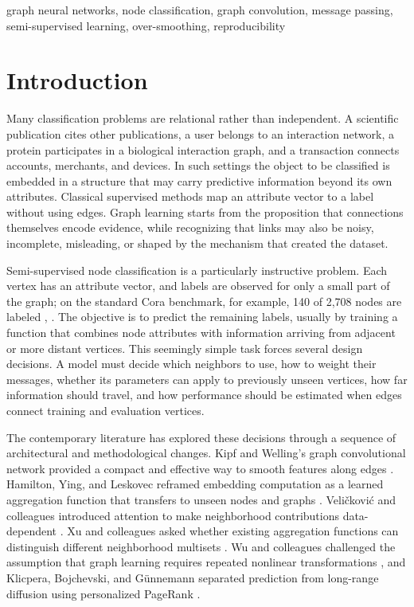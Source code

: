 \documentclass[conference]{IEEEtran}
\begin{document}
\begin{IEEEkeywords}
graph neural networks, node classification, graph convolution, message passing, semi-supervised learning, over-smoothing, reproducibility
\end{IEEEkeywords}

\section{Introduction}

Many classification problems are relational rather than independent. A scientific publication cites other publications, a user belongs to an interaction network, a protein participates in a biological interaction graph, and a transaction connects accounts, merchants, and devices. In such settings the object to be classified is embedded in a structure that may carry predictive information beyond its own attributes. Classical supervised methods map an attribute vector to a label without using edges. Graph learning starts from the proposition that connections themselves encode evidence, while recognizing that links may also be noisy, incomplete, misleading, or shaped by the mechanism that created the dataset.

Semi-supervised node classification is a particularly instructive problem. Each vertex has an attribute vector, and labels are observed for only a small part of the graph; on the standard Cora benchmark, for example, 140 of 2,708 nodes are labeled \cite{b1}, \cite{b12}. The objective is to predict the remaining labels, usually by training a function that combines node attributes with information arriving from adjacent or more distant vertices. This seemingly simple task forces several design decisions. A model must decide which neighbors to use, how to weight their messages, whether its parameters can apply to previously unseen vertices, how far information should travel, and how performance should be estimated when edges connect training and evaluation vertices.

The contemporary literature has explored these decisions through a sequence of architectural and methodological changes. Kipf and Welling's graph convolutional network provided a compact and effective way to smooth features along edges \cite{b1}. Hamilton, Ying, and Leskovec reframed embedding computation as a learned aggregation function that transfers to unseen nodes and graphs \cite{b2}. Veličković and colleagues introduced attention to make neighborhood contributions data-dependent \cite{b3}. Xu and colleagues asked whether existing aggregation functions can distinguish different neighborhood multisets \cite{b4}. Wu and colleagues challenged the assumption that graph learning requires repeated nonlinear transformations \cite{b5}, and Klicpera, Bojchevski, and Günnemann separated prediction from long-range diffusion using personalized PageRank \cite{b6}.
\end{document}
